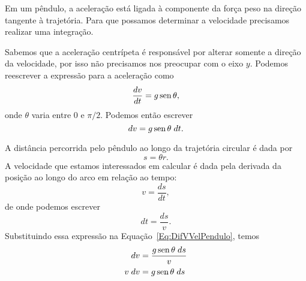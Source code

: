 \begin{marginfigure}
\centering
{}
\caption{Em um pêndulo, a aceleração está ligada à componente da força peso na direção tangente à trajetória. Para que possamos determinar a velocidade precisamos realizar uma integração.}
\end{marginfigure}

\noindent{}Sabemos que a aceleração centrípeta é responsável por alterar somente a direção da velocidade, por isso não precisamos nos preocupar com o eixo $y$. Podemos reescrever a expressão para a aceleração como
\begin{equation}
    \frac{dv}{dt} = g \operatorname{sen}\theta,
\end{equation}
%
onde $\theta$ varia entre 0 e $\pi/2$. Podemos então escrever
\begin{equation}\label{Eq:DifVVelPendulo}
    dv = g\operatorname{sen}\theta \;dt.
\end{equation}

A distância percorrida pelo pêndulo ao longo da trajetória circular é dada por
\begin{equation}
    s = \theta r.
\end{equation}
%
A velocidade que estamos interessados em calcular é dada pela derivada da posição ao longo do arco em relação ao tempo:
\begin{equation}
    v = \frac{ds}{dt},
\end{equation}
%
de onde podemos escrever
\begin{equation}
    dt = \frac{ds}{v}.
\end{equation}
%
Substituindo essa expressão na Equação~\ref{Eq:DifVVelPendulo}, temos
\begin{align}
    dv &= \frac{g \operatorname{sen}\theta \;ds}{v} \\
    v\;dv &=  g \operatorname{sen} \theta \; ds
\end{align}

